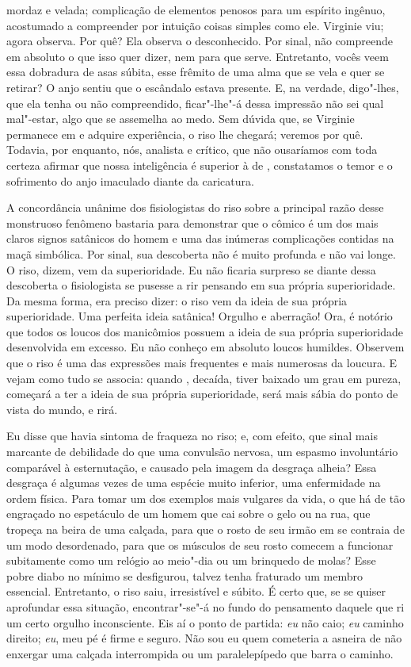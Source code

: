 mordaz e velada; complicação de elementos penosos para um espírito
ingênuo, acostumado a compreender por intuição coisas simples como ele.
Virginie viu; agora observa. Por quê? Ela observa o desconhecido. Por
sinal, não compreende em absoluto o que isso quer dizer, nem para que
serve. Entretanto, vocês veem essa dobradura de asas súbita, esse
frêmito de uma alma que se vela e quer se retirar? O anjo sentiu que o
escândalo estava presente. E, na verdade, digo"-lhes, que ela tenha ou
não compreendido, ficar"-lhe"-á dessa impressão não sei qual mal"-estar,
algo que se assemelha ao medo. Sem dúvida que, se Virginie permanece em
 e adquire experiência, o riso lhe chegará; veremos por quê.
Todavia, por enquanto, nós, analista e crítico, que não ousaríamos com
toda certeza afirmar que nossa inteligência é superior à de ,
constatamos o temor e o sofrimento do anjo imaculado diante da
caricatura.

\sectionitem

A concordância unânime dos fisiologistas do riso sobre a principal razão
desse monstruoso fenômeno bastaria para demonstrar que o cômico é um
dos mais claros signos satânicos do homem e uma das inúmeras
complicações contidas na maçã simbólica. Por sinal, sua descoberta não
é muito profunda e não vai longe. O riso, dizem, vem da superioridade.
Eu não ficaria surpreso se diante dessa descoberta o fisiologista se
pusesse a rir pensando em sua própria superioridade. Da mesma forma,
era preciso dizer: o riso vem da ideia de sua própria superioridade.
Uma perfeita ideia satânica! Orgulho e aberração! Ora, é notório que
todos os loucos dos manicômios possuem a ideia de sua própria
superioridade desenvolvida em excesso. Eu não conheço em absoluto
loucos humildes. Observem que o riso é uma das expressões mais
frequentes e mais numerosas da loucura. E vejam como tudo se associa:
quando , decaída, tiver baixado um grau em pureza, começará a
ter a ideia de sua própria superioridade, será mais sábia do ponto de
vista do mundo, e rirá.

Eu disse que havia sintoma de fraqueza no riso; e, com efeito, que sinal
mais marcante de debilidade do que uma convulsão nervosa, um espasmo
involuntário comparável à esternutação, e causado pela imagem da
desgraça alheia? Essa desgraça é algumas vezes de uma espécie muito
inferior, uma enfermidade na ordem física. Para tomar um dos exemplos
mais vulgares da vida, o que há de tão engraçado no espetáculo de um
homem que cai sobre o gelo ou na rua, que tropeça na beira de uma
calçada, para que o rosto de seu irmão em  se contraia de
um modo desordenado, para que os músculos de seu rosto comecem a
funcionar subitamente como um relógio ao meio"-dia ou um brinquedo de
molas? Esse pobre diabo no mínimo se desfigurou, talvez tenha fraturado
um membro essencial. Entretanto, o riso saiu, irresistível e súbito. É
certo que, se se quiser aprofundar essa situação, encontrar"-se"-á no
fundo do pensamento daquele que ri um certo orgulho inconsciente. Eis
aí o ponto de partida: \textit{eu }não caio; \textit{eu }caminho
direito; \textit{eu}, meu pé é firme e seguro. Não sou eu quem cometeria
a asneira de não enxergar uma calçada interrompida ou um paralelepípedo
que barra o caminho.

